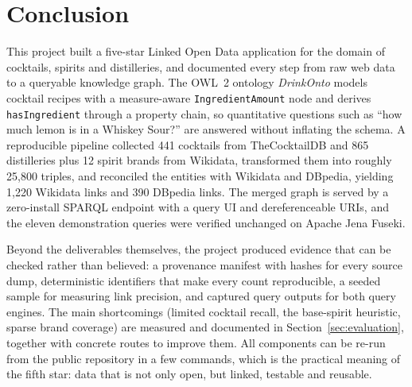 \section{Conclusion}
\label{sec:conclusion}

This project built a five-star Linked Open Data application for the domain of
cocktails, spirits and distilleries, and documented every step from raw web
data to a queryable knowledge graph. The OWL~2 ontology \emph{DrinkOnto}
models cocktail recipes with a measure-aware \texttt{IngredientAmount} node and
derives \texttt{hasIngredient} through a property chain, so quantitative
questions such as ``how much lemon is in a Whiskey Sour?'' are answered without
inflating the schema. A reproducible pipeline collected 441 cocktails from
TheCocktailDB and 865 distilleries plus 12 spirit brands from Wikidata,
transformed them into roughly 25{,}800 triples, and reconciled the entities with
Wikidata and DBpedia, yielding 1{,}220 Wikidata links and 390 DBpedia links.
The merged graph is served by a zero-install SPARQL endpoint with a query UI
and dereferenceable URIs, and the eleven demonstration queries were verified
unchanged on Apache Jena Fuseki.

Beyond the deliverables themselves, the project produced evidence that can be
checked rather than believed: a provenance manifest with hashes for every
source dump, deterministic identifiers that make every count reproducible, a
seeded sample for measuring link precision, and captured query outputs for both
query engines. The main shortcomings (limited cocktail recall, the
base-spirit heuristic, sparse brand coverage) are measured and documented in
Section~\ref{sec:evaluation}, together with concrete routes to improve them. All components can be
re-run from the public repository in a few commands, which is the practical
meaning of the fifth star: data that is not only open, but linked, testable and
reusable.
